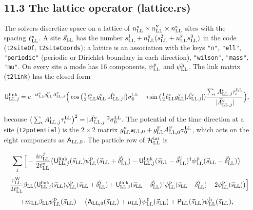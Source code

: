 \documentclass[
  10pt,
]{article}
\begin{document}
\hypertarget{the-lattice-operator-lattice.rs}{%
\subsection{11.3 The lattice operator
(lattice.rs)}\label{the-lattice-operator-lattice.rs}}

The solvers discretize space on a lattice of
\(n^{\rm x}_{\rm LL}\times n^{\rm y}_{\rm LL}\times n^{\rm z}_{\rm LL}\)
sites with the spacing \(\ell^{\rm x}_{\rm LL}\). A site
\(\vec s_{\rm LL}\) has the number
\(s^1_{\rm LL}+n^{\rm x}_{\rm LL}(s^2_{\rm LL}+n^{\rm y}_{\rm LL}s^3_{\rm LL})\)
in the code (\texttt{t2siteOf}, \texttt{t2siteCoords}); a lattice is an
association with the keys \texttt{"n"}, \texttt{"ell"},
\texttt{"periodic"} (periodic or Dirichlet boundary in each direction),
\texttt{"wilson"}, \texttt{"mass"}, \texttt{"mu"}. On every site a mode
has 16 components, \(\psi^{\rm p}_{\rm LL}\) and
\(\psi^{\rm h}_{\rm LL}\). The link matrix (\texttt{t2link}) has the
closed form

\[\mathsf U^{\rm link}_{{\rm LL},j}=e^{-i\ell^{\rm x}_{\rm LL}g^{\rm F}_{\rm LL}A^{\rm F}_{{\rm LL},j}}\Big(\cos\big(\tfrac12\ell^{\rm x}_{\rm LL}g^{\rm v}_{\rm LL}\lvert\vec A^{\rm v}_{{\rm LL},j}\rvert\big)\sigma^{\rm LL}_0-i\sin\big(\tfrac12\ell^{\rm x}_{\rm LL}g^{\rm v}_{\rm LL}\lvert\vec A^{\rm v}_{{\rm LL},j}\rvert\big)\frac{\sum_\iota A^\iota_{{\rm LL},j}\tau^{\rm LL}_\iota}{\lvert\vec A^{\rm v}_{{\rm LL},j}\rvert}\Big),\]

because
\(\big(\sum_\iota A^\iota_{{\rm LL},j}\tau^{\rm LL}_\iota\big)^2=\lvert\vec A^{\rm v}_{{\rm LL},j}\rvert^2\sigma^{\rm LL}_0\).
The potential of the time direction at a site (\texttt{t2potential}) is
the \(2\times2\) matrix
\(g^{\rm v}_{\rm LL}\mathsf a_{{\rm LL},0}+g^{\rm F}_{\rm LL}A^{\rm F}_{{\rm LL},0}\sigma^{\rm LL}_0\),
which acts on the eight components as \(\mathsf A_{{\rm LL},0}\). The
particle row of \(\mathcal H^{\rm lat}_{\rm LL}\) is

\[\sum_j\Big[-\frac{i\alpha^j_{\rm LL}}{2\ell^{\rm x}_{\rm LL}}\big(\mathsf U^{\rm link}_{{\rm LL},j}(\vec s_{\rm LL})\psi^{\rm p}_{\rm LL}(\vec s_{\rm LL}+\vec\delta^j_{\rm LL})-\mathsf U^{\rm link}_{{\rm LL},j}(\vec s_{\rm LL}-\vec\delta^j_{\rm LL})^\dagger\psi^{\rm p}_{\rm LL}(\vec s_{\rm LL}-\vec\delta^j_{\rm LL})\big)\]
\[-\frac{r^{\rm W}_{\rm LL}}{2\ell^{\rm x}_{\rm LL}}\beta_{\rm LL}\big(\mathsf U^{\rm link}_{{\rm LL},j}(\vec s_{\rm LL})\psi^{\rm p}_{\rm LL}(\vec s_{\rm LL}+\vec\delta^j_{\rm LL})+\mathsf U^{\rm link}_{{\rm LL},j}(\vec s_{\rm LL}-\vec\delta^j_{\rm LL})^\dagger\psi^{\rm p}_{\rm LL}(\vec s_{\rm LL}-\vec\delta^j_{\rm LL})-2\psi^{\rm p}_{\rm LL}(\vec s_{\rm LL})\big)\Big]\]
\[+m_{\rm LL}\beta_{\rm LL}\psi^{\rm p}_{\rm LL}(\vec s_{\rm LL})-\big(\mathsf A_{{\rm LL},0}(\vec s_{\rm LL})+\mu_{\rm LL}\big)\psi^{\rm p}_{\rm LL}(\vec s_{\rm LL})+\mathsf P_{\rm LL}(\vec s_{\rm LL})\psi^{\rm h}_{\rm LL}(\vec s_{\rm LL}),\]
\end{document}
